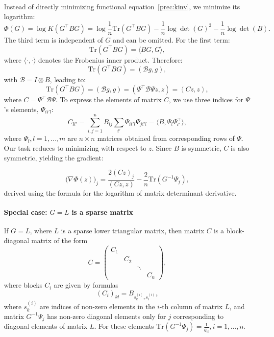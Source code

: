 \documentclass[10pt]{article} %
\def\eqref#1{equation~\ref{#1}}
\theoremstyle{plain}
\theoremstyle{definition}
\theoremstyle{remark}
\begin{document}
Instead of directly minimizing functional \eqref{prec:kinv}, we minimize its logarithm:
\begin{equation*}
\Phi(G) = \log K(G^{\top} B G) = \log \frac{1}{n}\mathrm{Tr}(G^{\top} B G) - \frac{1}{n} \log \det(G)^2 - \frac{1}{n} \log \det(B).
\end{equation*}
The third term is independent of $G$ and can be omitted.
For the first term:
\begin{equation*}
	\mathrm{Tr}(G^{\top} B G) = \langle B G, G \rangle,
\end{equation*}
where $\langle \cdot, \cdot \rangle$ denotes the Frobenius inner product. Therefore:
\begin{equation*}
	\mathrm{Tr}(G^{\top} B G) = (\mathcal{B} g, g), 
\end{equation*}
with $\mathcal{B} = I \otimes B$, leading to:
\begin{equation*}
	\mathrm{Tr}(G^{\top} B G) = (\mathcal{B} g, g) = (\Psi^{\top} \mathcal{B} \Psi z, z) = (Cz, z),
\end{equation*}
where $C = \Psi^{\top} \mathcal{B} \Psi$.
To express the elements of matrix $C$, we use three indices for $\Psi$'s elements, $\Psi_{ii' l}$:
\begin{equation*}
	C_{ll'} = \sum_{i,j=1}^n B_{ij} \sum_{i'} \Psi_{ii' l} \Psi_{j i' l} = \langle B, \Psi_l \Psi^{\top}_{l'} \rangle,
\end{equation*}
where $\Psi_l, l = 1, \ldots, m$ are $n \times n$ matrices obtained from corresponding rows of $\Psi$.
Our task reduces to minimizing with respect to $z$.
Since $B$ is symmetric, $C$ is also symmetric, yielding the gradient:

$$\big(\nabla \Phi(z)\big)_j = \frac{2 (Cz)_j }{(Cz, z)} - \frac{2}{n} \mathrm{Tr}({G^{-1} \Psi_j}),$$
derived using the formula for the logarithm of matrix determinant derivative.

\paragraph{Special case: $G = L$ is a sparse matrix}

If $G=L$, where $L$ is a sparse lower triangular matrix, then matrix $C$ is a block-diagonal matrix of the form
\begin{equation*}
C = \begin{pmatrix}
C_1 & & & \\
& C_2 & & \\
& & \ddots & \\
& & & C_n
\end{pmatrix},
\end{equation*}
where blocks $C_i$ are given by formulas
\begin{equation*}
(C_i)_{kl} = B_{s^{(i)}_k, s^{(i)}_l},
\end{equation*}
where $s^{(i)}_k$ are indices of non-zero elements in the $i$-th column of matrix $L$, and
matrix $G^{-1} \Psi_j$ has non-zero diagonal elements only for $j$ corresponding to diagonal elements of matrix $L$. 
For these elements
$\mathrm{Tr}(G^{-1} \Psi_j) = \frac{1}{g_{ii}}, i = 1, \ldots, n$.
\end{document}
